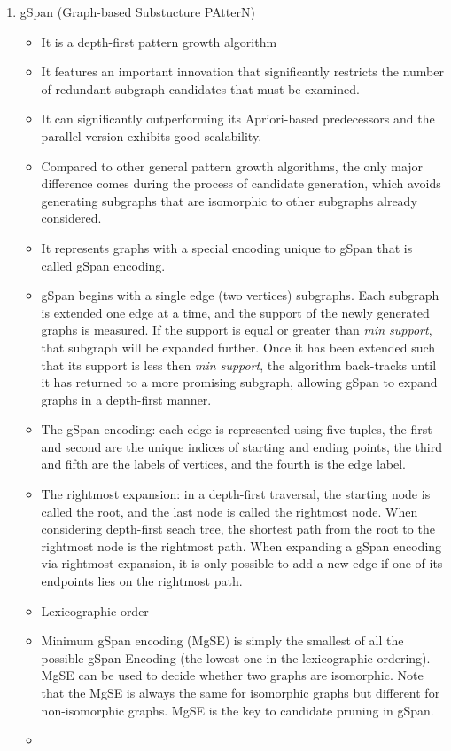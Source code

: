 \documentclass[14pt]{article}
\begin{document}
\begin{enumerate}
\item gSpan (Graph-based Substucture PAtterN)
 \begin{itemize}
  \item It is a depth-first pattern growth algorithm
  \item It features an important innovation that significantly restricts the number of redundant subgraph candidates that must be examined.
  \item It can significantly outperforming its Apriori-based predecessors and the parallel version exhibits good scalability.
  \item Compared to other general pattern growth algorithms, the only major difference comes during the process of candidate generation, which avoids generating subgraphs that are isomorphic to other subgraphs already considered.
  \item It represents graphs with a special encoding unique to gSpan that is called gSpan encoding. 
  \item gSpan begins with a single edge (two vertices) subgraphs. Each subgraph is extended one edge at a time, and the support of the newly generated graphs is measured. If the support is equal or greater than \emph{min support}, that subgraph will be expanded further. Once it has been extended such that its support is less then \emph{min support}, the algorithm back-tracks until it has returned to a more promising subgraph, allowing gSpan to expand graphs in a depth-first manner.
  \item The gSpan encoding: each edge is represented using five tuples, the first and second are the unique indices of starting and ending points, the third and fifth are the labels of vertices, and the fourth is the edge label.
  \item The rightmost expansion: in a depth-first traversal, the starting node is called the root, and the last node is called the rightmost node. When considering depth-first seach tree, the shortest path from the root to the rightmost node is the rightmost path. When expanding a gSpan encoding via rightmost expansion, it is only possible to add a new edge if one of its endpoints lies on the rightmost path.
  \item Lexicographic order
  \item Minimum gSpan encoding (MgSE) is simply the smallest of all the possible gSpan Encoding (the lowest one in the lexicographic ordering). MgSE can be used to decide whether two graphs are isomorphic. Note that the MgSE is always the same for isomorphic graphs but different for non-isomorphic graphs. MgSE is the key to candidate pruning in gSpan.
  \item 
 \end{itemize}

\end{enumerate}
\end{document}
